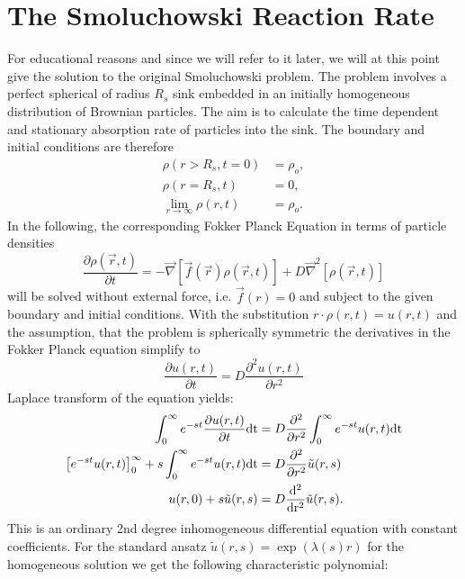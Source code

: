 \section{The Smoluchowski Reaction Rate}
For educational reasons and since we will refer to it later, we will at this point give the solution to the original Smoluchowski problem.
The problem involves a perfect spherical of radius $R_s$ sink embedded in an initially homogeneous distribution of Brownian particles. The aim is to calculate the time dependent and stationary absorption rate of particles into the sink.
The boundary and initial conditions are therefore
\begin{align}
    \rho(r > R_s, t = 0) &= \rho_o, \\
    \rho(r=R_s,t) &= 0, \\
    \lim_{r \rightarrow \infty} \rho(r, t) &= \rho_o.
    \label{BC}
\end{align}
In the following, the corresponding Fokker Planck Equation in terms of particle densities
\begin{equation}
        \frac{\partial \rho(\vec{r},t)}{\partial t} = - \vec \nabla \left[ \vec f(\vec{r})\rho(\vec{r},t) \right] + D\vec \nabla ^2 \left[\rho(\vec{r},t) \right] 
    \label{FPE3}
\end{equation}
will be solved without external force, i.e. $\vec f(r) = 0$ and subject to the given boundary and initial conditions.
With the substitution $r \cdot \rho(r,t) = u(r,t)$ and the assumption, that the problem is spherically symmetric the derivatives in the Fokker Planck equation simplify to
\begin{equation}
    \frac{\partial u(r,t)}{\partial t} = D \frac{\partial ^2 u(r,t)}{\partial r^2}
    \label{Simplified FPE}
\end{equation}
Laplace transform of the equation yields:
\begin{align}
    \int_0^\infty e^{-st}\frac{\partial u(r,t)}{\partial t} \rm{d} t &= D \frac{\partial ^2 }{\partial r^2} \int_0^\infty e^{-st} u(r,t) \rm{d} t \\
    \left[e^{-st} u(r,t) \right]_0^\infty + s \int_0^\infty e^{-st} u(r,t) \rm{d} t &= D \frac{\partial^2}{\partial r^2} \tilde{u}(r,s)\\
    u(r,0) + s \tilde{u}(r,s) &= D \frac{\rm{d}^2}{\rm{d} r^2} \tilde{u}(r,s).
\end{align}
This is an ordinary 2nd degree inhomogeneous differential equation with constant coefficients.
For the standard ansatz $\tilde{u}(r,s) = \exp(\lambda(s) r)$ for the homogeneous solution we get the following characteristic polynomial:
